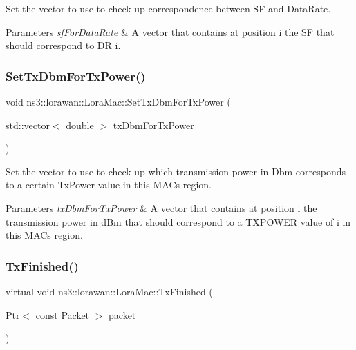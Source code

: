 Set the vector to use to check up correspondence between SF and Data\+Rate.


\begin{DoxyParams}{Parameters}
{\em sf\+For\+Data\+Rate} & A vector that contains at position i the SF that should correspond to DR i. \\
\hline
\end{DoxyParams}
\mbox{\label{classns3_1_1lorawan_1_1LoraMac_a398100d19be0294f87f7c102f8ff141b}} 
\subsubsection{\texorpdfstring{Set\+Tx\+Dbm\+For\+Tx\+Power()}{SetTxDbmForTxPower()}}
{\footnotesize\ttfamily void ns3\+::lorawan\+::\+Lora\+Mac\+::\+Set\+Tx\+Dbm\+For\+Tx\+Power (\begin{DoxyParamCaption}\item[{std\+::vector$<$ double $>$}]{tx\+Dbm\+For\+Tx\+Power }\end{DoxyParamCaption})}

Set the vector to use to check up which transmission power in Dbm corresponds to a certain Tx\+Power value in this M\+AC\textquotesingle{}s region.


\begin{DoxyParams}{Parameters}
{\em tx\+Dbm\+For\+Tx\+Power} & A vector that contains at position i the transmission power in d\+Bm that should correspond to a T\+X\+P\+O\+W\+ER value of i in this M\+AC\textquotesingle{}s region. \\
\hline
\end{DoxyParams}
\mbox{\label{classns3_1_1lorawan_1_1LoraMac_aa64037192af83dc459487bccccd10bdf}} 
\subsubsection{\texorpdfstring{Tx\+Finished()}{TxFinished()}}
{\footnotesize\ttfamily virtual void ns3\+::lorawan\+::\+Lora\+Mac\+::\+Tx\+Finished (\begin{DoxyParamCaption}\item[{Ptr$<$ const Packet $>$}]{packet }\end{DoxyParamCaption})\hspace{0.3cm}{\ttfamily [pure virtual]}}

